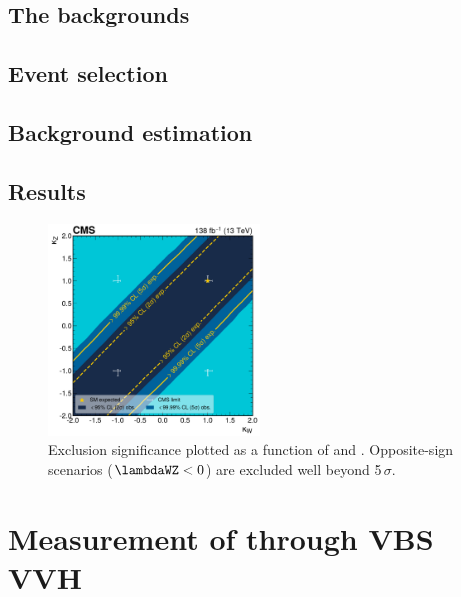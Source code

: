 \subsection{The backgrounds}
\subsection{Event selection}
\subsection{Background estimation}
\subsection{Results}
\begin{figure}[htb]
    \centering
    \includegraphics[width=0.5\textwidth]{fig/vbswh/exclusion_2D_contours_unblinded.pdf}
    \caption{
        Exclusion significance plotted as a function of \kW and \kZ.
        Opposite-sign scenarios ($\lambdaWZ < 0$) are excluded well beyond 5$\,\sigma$. 
    }
    \label{fig:vbswh_limit}
\end{figure}

\section{Measurement of \kVV through VBS VVH}

